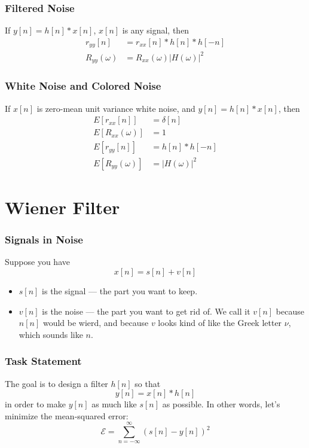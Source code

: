\documentclass{beamer}
\begin{document}
\begin{frame}
  \frametitle{Filtered Noise}

  If $y[n]=h[n]\ast x[n]$, $x[n]$ is any signal, then
  \begin{align*}
    r_{yy}[n] &= r_{xx}[n]\ast h[n]\ast h[-n]\\
    R_{yy}(\omega) &= R_{xx}(\omega) |H(\omega)|^2
  \end{align*}
\end{frame}
  
\begin{frame}
  \frametitle{White Noise and Colored Noise}
  
  If $x[n]$ is zero-mean unit variance white noise, and $y[n]=h[n]\ast
  x[n]$, then
  \begin{align*}
    E\left[r_{xx}[n]\right] &= \delta[n]\\
    E\left[R_{xx}(\omega)\right] &= 1\\
    E\left[r_{yy}[n]\right] &= h[n]\ast h[-n]\\
    E\left[R_{yy}(\omega)\right] &= |H(\omega)|^2
  \end{align*}
\end{frame}

\section[Wiener Filter]{Wiener Filter}
\setcounter{subsection}{1}

\begin{frame}
  \frametitle{Signals in Noise}

  Suppose you have
  \begin{displaymath}
    x[n] = s[n]+v[n]
  \end{displaymath}
  \begin{itemize}
  \item $s[n]$ is the signal --- the part you want to keep.
  \item $v[n]$ is the noise --- the part you want to get rid of.  We
    call it $v[n]$ because $n[n]$ would be wierd, and because $v$
    looks kind of like the Greek letter $\nu$, which sounds like $n$.
  \end{itemize}
\end{frame}

\begin{frame}
  \frametitle{Task Statement}

  The goal is to design a filter $h[n]$ so that
  \begin{displaymath}
    y[n]=x[n]\ast h[n]
  \end{displaymath}
  in order to make $y[n]$ as much like $s[n]$ as possible.  In other
  words, let's minimize the mean-squared error:
  \begin{displaymath}
    {\mathcal E}=\sum_{n=-\infty}^\infty \left(s[n]-y[n]\right)^2
  \end{displaymath}
\end{frame}
\end{document}
